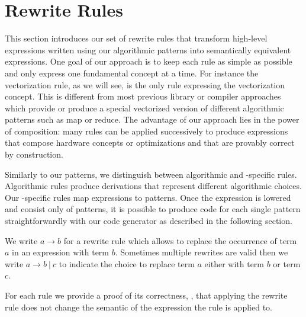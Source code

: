 \section{Rewrite Rules}
\label{section:rules}

This section introduces our set of rewrite rules that transform high-level expressions written using our algorithmic patterns into semantically equivalent expressions.
One goal of our approach is to keep each rule as simple as possible and only express one fundamental concept at a time.
For instance the vectorization rule, as we will see, is the only rule expressing the vectorization concept.
This is different from most previous library or compiler approaches which provide or produce a special vectorized version of different algorithmic patterns such as map or reduce.
The advantage of our approach lies in the power of composition:
many rules can be applied successively to produce expressions that compose hardware concepts or optimizations and that are provably correct by construction.

Similarly to our patterns, we distinguish between algorithmic and \OpenCL-specific rules.
Algorithmic rules produce derivations that represent different algorithmic choices.
Our \OpenCL-specific rules map expressions to \OpenCL patterns.
Once the expression is lowered and consist only of \OpenCL patterns, it is possible to produce \OpenCL code for each single pattern straightforwardly with our code generator as described in the following section.

We write $a \rightarrow b$ for a rewrite rule which allows to replace the occurrence of term $a$ in an expression with term $b$.
Sometimes multiple rewrites are valid then we write $a \rightarrow b\ |\ c$ to indicate the choice to replace term $a$ either with term $b$ or term $c$.

For each rule we provide a proof of its correctness, \ie, that applying the rewrite rule does not change the semantic of the expression the rule is applied to.



